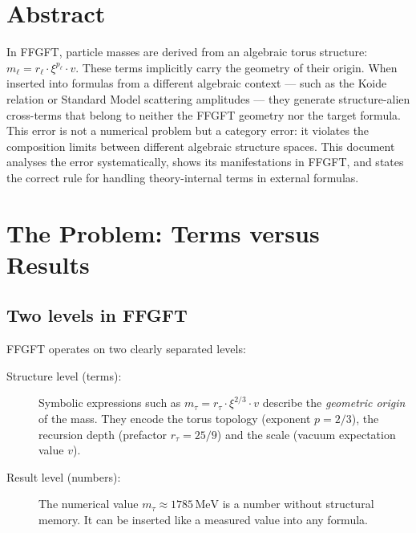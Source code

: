 
\section*{Abstract}

In FFGFT, particle masses are derived from an algebraic torus structure:
$m_\ell = r_\ell \cdot \xi^{p_\ell} \cdot v$. These terms implicitly carry
the geometry of their origin. When inserted into formulas from a different
algebraic context — such as the Koide relation or Standard Model scattering
amplitudes — they generate structure-alien cross-terms that belong to neither
the FFGFT geometry nor the target formula. This error is not a numerical
problem but a category error: it violates the composition limits between
different algebraic structure spaces. This document analyses the error
systematically, shows its manifestations in FFGFT, and states the correct
rule for handling theory-internal terms in external formulas.

\section{The Problem: Terms versus Results}

\subsection{Two levels in FFGFT}

FFGFT operates on two clearly separated levels:

\begin{description}
  \item[Structure level (terms):] Symbolic expressions such as
    $m_\tau = r_\tau \cdot \xi^{2/3} \cdot v$ describe the
    \emph{geometric origin} of the mass. They encode the torus topology
    (exponent $p = 2/3$), the recursion depth (prefactor $r_\tau = 25/9$)
    and the scale (vacuum expectation value $v$).
  \item[Result level (numbers):] The numerical value
    $m_\tau \approx 1785\,\text{MeV}$ is a number without structural
    memory. It can be inserted like a measured value into any formula.
\end{description}

